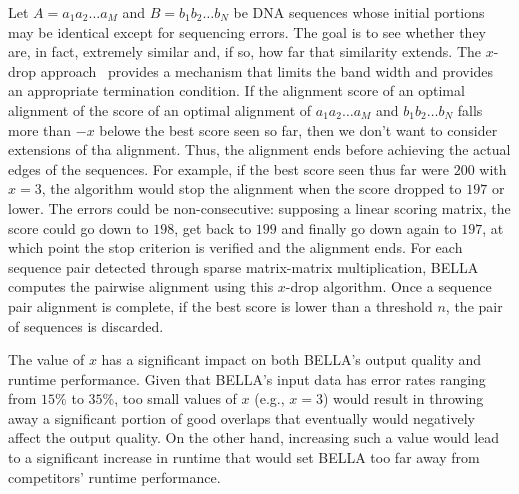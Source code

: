 Let $A = a_1a_2 \dots a_M$ and $B = b_1b_2 \dots b_N$ be DNA sequences whose initial portions may be identical except for sequencing errors.
The goal is to see whether they are, in fact, extremely similar and, if so, how far that similarity extends.
The $x$-drop approach~\citep{zhang2000greedy} provides a mechanism that limits the band width and provides an appropriate termination condition.
If the alignment score of an optimal alignment of the score of an optimal alignment of $a_1a_2 \dots a_M$ and $b_1b_2 \dots b_N$ falls more than $-x$ belowe the best score seen so far, then we don't want to consider extensions of tha alignment.
Thus, the alignment ends before achieving the actual edges of the sequences. 
For example, if the best score seen thus far were $200$ with $x = 3$, the algorithm would stop the alignment when the score dropped to $197$ or lower.
The errors could be non-consecutive: supposing a linear scoring matrix, the score could go down to $198$, get back to $199$ and finally go down again to $197$, at which point the stop criterion is verified and the alignment ends.
For each sequence pair detected through sparse matrix-matrix multiplication, BELLA computes the pairwise alignment using this $x$-drop algorithm. 
Once a sequence pair alignment is complete, if the best score is lower than a threshold $n$, the pair of sequences is discarded.

The value of $x$ has a significant impact on both BELLA's output quality and runtime performance.
Given that BELLA's input data has error rates ranging from $15\%$ to $35\%$, too small values of $x$ (e.g., $x = 3$) would result in throwing away a significant portion of good overlaps that eventually would negatively affect the output quality.
On the other hand, increasing such a value would lead to a significant increase in runtime that would set BELLA too far away from competitors' runtime performance.
